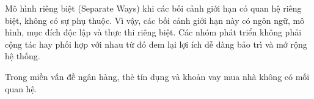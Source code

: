  Mô hình riêng biệt (Separate Ways) khi các bối cảnh giới hạn     có quan hệ riêng biệt, không có sự phụ thuộc. Vì vậy,  các   bối cảnh giới hạn   này     có  ngôn ngữ,  mô hình,  mục đích độc lập  và        thực thi riêng biệt.  Các nhóm phát triển không phải cộng tác hay phối hợp  với nhau từ đó   đem lại lợi ích  dễ dàng bảo trì và mở rộng hệ thống.

\begin{example} Trong miền vấn đề ngân hàng,     thẻ tín dụng và khoản vay mua nhà không có mối quan hệ. 
    
\end{example} 
